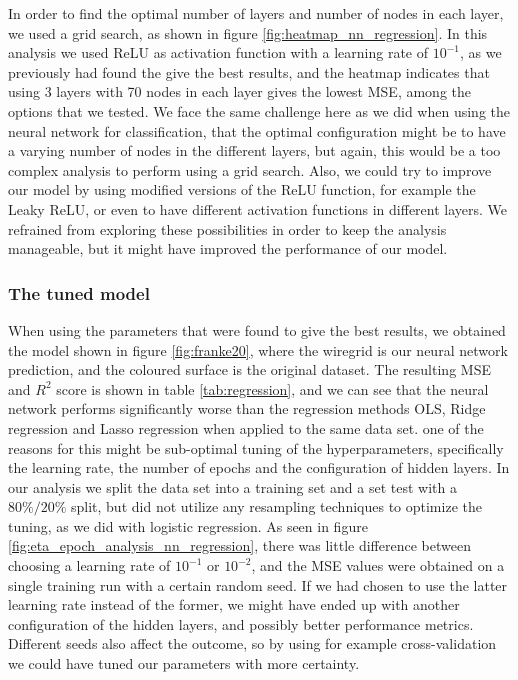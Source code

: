 In order to find the optimal number of layers and number of nodes in each layer, we used a grid search, as shown in figure \ref{fig:heatmap_nn_regression}. In this analysis we used ReLU as activation function with a learning rate of $10^{-1}$, as we previously had found the give the best results, and the heatmap indicates that using 3 layers with 70 nodes in each layer gives the lowest MSE, among the options that we tested. We face the same challenge here as we did when using the neural network for classification, that the optimal configuration might be to have a varying number of nodes in the different layers, but again, this would be a too complex analysis to perform using a grid search. Also, we could try to improve our model by using modified versions of the ReLU function, for example the Leaky ReLU, or even to have different activation functions in different layers. We refrained from exploring these possibilities in order to keep the analysis manageable, but it might have improved the performance of our model.

\subsubsection{The tuned model}

When using the parameters that were found to give the best results, we obtained the model shown in figure \ref{fig:franke20}, where the wiregrid is our neural network prediction, and the coloured surface is the original dataset. The resulting MSE and $R^2$ score is shown in table \ref{tab:regression}, and we can see that the neural network performs significantly worse than the regression methods OLS, Ridge regression and Lasso regression when applied to the same data set. one of the reasons for this might be sub-optimal tuning of the hyperparameters, specifically the learning rate, the number of epochs and the configuration of hidden layers. In our analysis we split the data set into a training set and a set test with a $80\%/20\%$ split, but did not utilize any resampling techniques to optimize the tuning, as we did with logistic regression. As seen in figure \ref{fig:eta_epoch_analysis_nn_regression}, there was little difference between choosing a learning rate of $10^{-1}$ or $10^{-2}$, and the MSE values were obtained on a single training run with a certain random seed. If we had chosen to use the latter learning rate instead of the former, we might have ended up with another configuration of the hidden layers, and possibly better performance metrics. Different seeds also affect the outcome, so by using for example cross-validation we could have tuned our parameters with more certainty.

